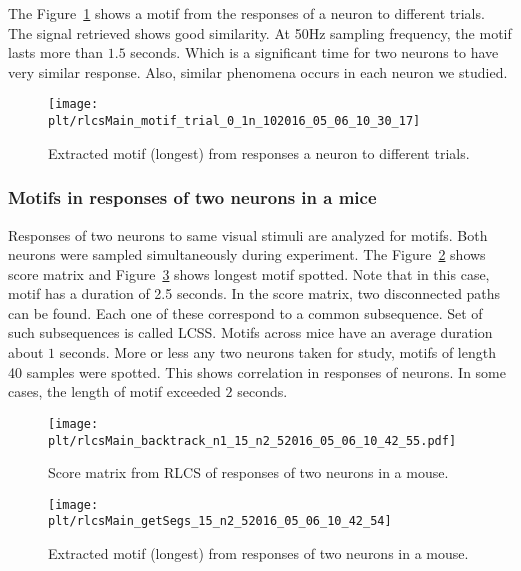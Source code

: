 \documentclass[MTech]{iitmdiss}
\newcommand{\plt}{thesis_plots}
\begin{document}
The Figure~\ref{img:motif_trial} shows a motif from the responses of a neuron to different trials. The signal retrieved shows good similarity. At 50Hz sampling frequency, the motif lasts more than $1.5$ seconds. Which is a significant time for two neurons to have very similar response. Also, similar phenomena occurs in each neuron we studied.
\begin{figure}[h]
    \centering
    \texttt{[image: \\plt/rlcsMain\_motif\_trial\_0\_1n\_102016\_05\_06\_10\_30\_17]}
    \caption{Extracted motif (longest) from responses a neuron to different trials.}
    \label{img:motif_trial}
\end{figure}
\subsubsection{Motifs in responses of two neurons in a mice} %
\label{ssub:motifs_in_responses_of_two_neurons_in_a_mice}
Responses of two neurons to same visual stimuli are analyzed for motifs. Both neurons were sampled simultaneously during experiment. The Figure~\ref{img:score_neuron} shows score matrix and Figure~\ref{img:motif_neuron} shows longest motif spotted. Note that in this case, motif has a duration of 2.5 seconds. In the score matrix, two disconnected paths can be found. Each one of these correspond to a common subsequence. Set of such subsequences is called LCSS. Motifs across mice have an average duration about $1$ seconds. More or less any two neurons taken for study, motifs of length 40 samples were spotted. This shows correlation in responses of neurons. In some cases, the length of motif exceeded $2$ seconds.
\begin{figure}
    \centering
    \texttt{[image: \\plt/rlcsMain\_backtrack\_n1\_15\_n2\_52016\_05\_06\_10\_42\_55.pdf]}
    \caption{Score matrix from RLCS of responses of two neurons in a mouse.}
    \label{img:score_neuron}
\end{figure}
\begin{figure}
    \centering
    \texttt{[image: \\plt/rlcsMain\_getSegs\_15\_n2\_52016\_05\_06\_10\_42\_54]}
    \caption{Extracted motif (longest) from responses of two neurons in a mouse.}
    \label{img:motif_neuron}
\end{figure}
\end{document}
